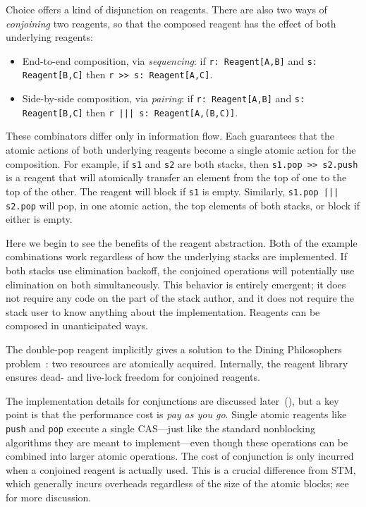 \documentclass[preprint,nocopyrightspace]{sigplanconf}
\begin{document}
Choice offers a kind of disjunction on reagents.  There are also two
ways of \emph{conjoining} two reagents, so that the composed reagent
has the effect of both underlying reagents:
\begin{itemize} %
\item End-to-end composition, via \emph{sequencing}: if 
  \lstinline{r: Reagent[A,B]} and \lstinline{s: Reagent[B,C]} then 
  \lstinline{r >> s: Reagent[A,C]}.
\item Side-by-side composition, via \emph{pairing}: if 
  \lstinline{r: Reagent[A,B]} and \lstinline{s: Reagent[B,C]} then 
  \lstinline{r ||| s: Reagent[A,(B,C)]}.  
\end{itemize}
These combinators differ only in information flow.  Each guarantees
that the atomic actions of both underlying reagents become a single
atomic action for the composition.  For example, if \lstinline{s1} and
\lstinline{s2} are both stacks, then \lstinline{s1.pop >> s2.push} is
a reagent that will atomically transfer an element from the top of one
to the top of the other.  The reagent will block if \lstinline{s1} is
empty.  Similarly, \lstinline{s1.pop ||| s2.pop} will pop, in one
atomic action, the top elements of both stacks, or block if either is
empty.

Here we begin to see the benefits of the reagent abstraction.  Both of
the example combinations work regardless of how the underlying stacks
are implemented.  If both stacks use elimination backoff, the
conjoined operations will potentially use elimination on both
simultaneously.  This behavior is entirely emergent; it does not
require any code on the part of the stack author, and it does not
require the stack user to know anything about the implementation.
Reagents can be composed in unanticipated ways.


The double-pop reagent implicitly gives a solution to the Dining
Philosophers problem~\cite{?}: two resources are atomically acquired.
Internally, the reagent library ensures dead- and live-lock freedom
for conjoined reagents.

The implementation details for conjunctions are discussed
later~(), but a key point is that the performance cost
is \emph{pay as you go}.  Single atomic reagents like \lstinline{push} and
\lstinline{pop} execute a single CAS---just like the standard nonblocking
algorithms they are meant to implement---even though these operations can be
combined into larger atomic operations.  The cost of conjunction is only
incurred when a conjoined reagent is actually used.  This is a crucial
difference from STM, which generally incurs overheads regardless of the size
of the atomic blocks; see~ for more discussion.
\end{document}
